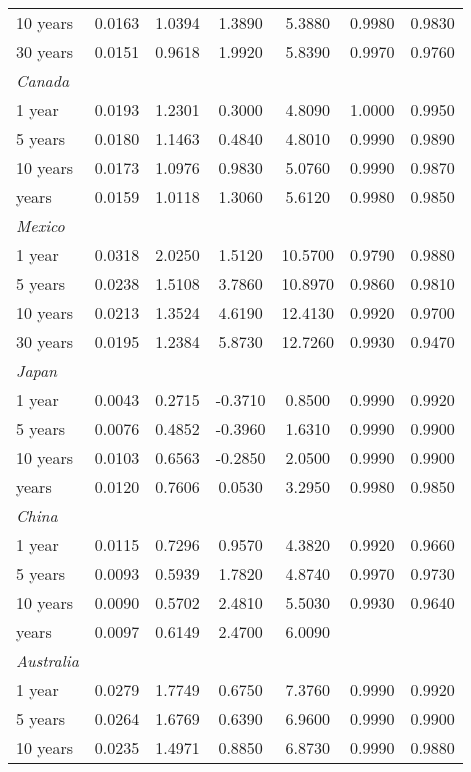 \documentclass{article}
\begin{document}
\begin{table}[H]
\begin{tabular}{l c c c c c c}
10 years	&	0.0163	&	1.0394	&	1.3890	&	5.3880	&	0.9980	&	0.9830	\\
30 years	&	0.0151	&	0.9618	&	1.9920	&	5.8390	&	0.9970	&	0.9760	\\
\textit{Canada}	&		&		&		&		&		&		\\
1 year	&	0.0193	&	1.2301	&	0.3000	&	4.8090	&	1.0000	&	0.9950	\\
5 years	&	0.0180	&	1.1463	&	0.4840	&	4.8010	&	0.9990	&	0.9890	\\
10 years	&	0.0173	&	1.0976	&	0.9830	&	5.0760	&	0.9990	&	0.9870	\\
\medskip													
30 years	&	0.0159	&	1.0118	&	1.3060	&	5.6120	&	0.9980	&	0.9850	\\
\textit{Mexico}	&		&		&		&		&		&		\\
1 year	&	0.0318	&	2.0250	&	1.5120	&	10.5700	&	0.9790	&	0.9880	\\
5 years	&	0.0238	&	1.5108	&	3.7860	&	10.8970	&	0.9860	&	0.9810	\\
10 years	&	0.0213	&	1.3524	&	4.6190	&	12.4130	&	0.9920	&	0.9700	\\
30 years	&	0.0195	&	1.2384	&	5.8730	&	12.7260	&	0.9930	&	0.9470	\\
\textit{Japan}	&		&		&		&		&		&		\\
1 year	&	0.0043	&	0.2715	&	-0.3710	&	0.8500	&	0.9990	&	0.9920	\\
5 years	&	0.0076	&	0.4852	&	-0.3960	&	1.6310	&	0.9990	&	0.9900	\\
10 years	&	0.0103	&	0.6563	&	-0.2850	&	2.0500	&	0.9990	&	0.9900	\\
\medskip													
30 years	&	0.0120	&	0.7606	&	0.0530	&	3.2950	&	0.9980	&	0.9850	\\
\textit{China}	&		&		&		&		&		&		\\
1 year	&	0.0115	&	0.7296	&	0.9570	&	4.3820	&	0.9920	&	0.9660	\\
5 years	&	0.0093	&	0.5939	&	1.7820	&	4.8740	&	0.9970	&	0.9730	\\
10 years	&	0.0090	&	0.5702	&	2.4810	&	5.5030	&	0.9930	&	0.9640	\\
\medskip													
30 years	&	0.0097	&	0.6149	&	2.4700	&	6.0090	&		&		\\
\textit{Australia}	&		&		&		&		&		&		\\
1 year	&	0.0279	&	1.7749	&	0.6750	&	7.3760	&	0.9990	&	0.9920	\\
5 years	&	0.0264	&	1.6769	&	0.6390	&	6.9600	&	0.9990	&	0.9900	\\
10 years	&	0.0235	&	1.4971	&	0.8850	&	6.8730	&	0.9990	&	0.9880	\\

\end{tabular}
\end{table}
\end{document}
